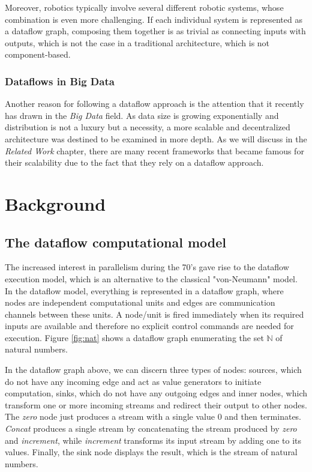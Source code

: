 \documentclass[sigplan,review,anonymous]{acmart}\settopmatter{printfolios=true}
\begin{document}
Moreover, robotics typically involve several different robotic systems, whose combination is even more challenging. If each individual system is represented as a dataflow graph, composing them together is as trivial as connecting inputs with outputs, which is not the case in a traditional architecture, which is not component-based.

\subsubsection{Dataflows in Big Data}

Another reason for following a dataflow approach is the attention that it recently has drawn in the \textit{Big Data} field. As data size is growing exponentially and distribution is not a luxury but a necessity, a more scalable and decentralized architecture was destined to be examined in more depth. As we will discuss in the \textit{Related Work} chapter, there are many recent frameworks that became famous for their scalability due to the fact that they rely on a dataflow approach.

\section{Background}

\subsection{The dataflow computational model}
The increased interest in parallelism during the 70's gave rise to the dataflow execution model, which is an alternative to the classical "von-Neumann" model. In the dataflow model, everything is represented in a dataflow graph, where nodes are independent computational units  and edges are communication channels between these units. A node/unit is fired immediately when its required inputs are available and therefore no explicit control commands are needed for execution. Figure \ref{fig:nat} shows a dataflow graph enumerating the set $\mathbb{N}$ of natural numbers.


In the dataflow graph above, we can discern three types of nodes: sources, which do not have any incoming edge and act as value generators to initiate computation, sinks, which do not have any outgoing edges and inner nodes, which transform one or more incoming streams and redirect their output to other nodes. The \textit{zero} node just produces a stream with a single value 0 and then terminates. \textit{Concat} produces a single stream by concatenating the stream produced by \textit{zero} and \textit{increment}, while \textit{increment} transforms its input stream by adding one to its values. Finally, the sink node displays the result, which is the stream of natural numbers.
\end{document}
